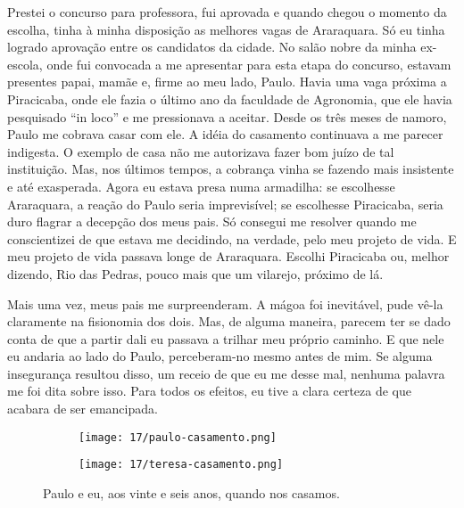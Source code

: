 Prestei o concurso para professora, fui aprovada e quando chegou o momento da escolha, tinha à minha disposição as melhores vagas de Araraquara.
Só eu tinha logrado aprovação entre os candidatos da cidade.
No salão nobre da minha ex-escola, onde fui convocada a me apresentar para esta etapa do concurso, estavam presentes papai, mamãe e, firme ao meu lado, Paulo.
Havia uma vaga próxima a Piracicaba, onde ele fazia o último ano da faculdade de Agronomia, que ele havia pesquisado ``in loco'' e me pressionava a aceitar.
Desde os três meses de namoro, Paulo me cobrava casar com ele.
A idéia do casamento continuava a me parecer indigesta.
O exemplo de casa não me autorizava fazer bom juízo de tal instituição.
Mas, nos últimos tempos, a cobrança vinha se fazendo mais insistente e até exasperada.
 Agora eu estava presa numa armadilha: se escolhesse Araraquara, a reação do Paulo seria imprevisível; se escolhesse Piracicaba, seria duro flagrar a decepção dos meus pais.
Só consegui me resolver quando me conscientizei de que estava me decidindo, na verdade, pelo meu projeto de vida.
E meu projeto de vida passava longe de Araraquara.
Escolhi Piracicaba ou, melhor dizendo, Rio das Pedras, pouco mais que um vilarejo, próximo de lá.

Mais uma vez, meus pais me surpreenderam.
A mágoa foi inevitável, pude vê-la claramente na fisionomia dos dois.
Mas, de alguma maneira, parecem ter se dado conta de que a partir dali eu passava a trilhar meu próprio caminho.
E que nele eu andaria ao lado do Paulo, perceberam-no mesmo antes de mim.
Se alguma insegurança resultou disso, um receio de que eu me desse mal, nenhuma palavra me foi dita sobre isso.
Para todos os efeitos, eu tive a clara certeza de que acabara de ser emancipada.

\begin{figure}[H]
\hfill
\centering
\begin{subfigure}[h]{0.4\linewidth}
\centering
\texttt{[image: 17/paulo-casamento.png]}
\end{subfigure}
\hfill
\begin{subfigure}[h]{0.4\linewidth}
\centering
\texttt{[image: 17/teresa-casamento.png]}
\end{subfigure}
\caption{Paulo e eu, aos vinte e seis anos, quando nos casamos.}
\end{figure}


